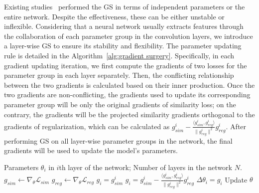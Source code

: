 \documentclass[runningheads]{llncs}
\begin{document}
Existing studies~\cite{yu2020gradient,mansilla2021domain} performed the GS in terms of independent parameters or the entire network. 
Despite the effectiveness, these can be either unstable or inflexible. Considering that a neural network usually extracts features through the collaboration of each parameter group in the convolution layers, we introduce a layer-wise GS to ensure its stability and flexibility. The parameter updating rule is detailed in the Algorithm~\ref{alg:gradient surgery}. Specifically, in each gradient updating iteration, we first compute the gradients of two losses for the parameter group in each layer separately. Then, the conflicting relationship between the two gradients is calculated based on their inner production. Once the two gradients are non-conflicting, the gradients used to update its corresponding parameter group will be only the original gradients of similarity loss; on the contrary, the gradients will be the projected similarity gradients orthogonal to the gradients of regularization, which can be calculated as $g_{sim}^{i} - \frac{\langle g_{sim}^{i}, g_{reg}^{i} \rangle}{\| g_{reg}^{i} \|^2} g_{reg}^{i}$. After performing GS on all layer-wise parameter groups in the network, the final gradients will be used to update the model's parameters.
\begin{minipage}{.75\linewidth}
\centering
\begin{algorithm}[H]
\caption{Gradient surgery}
\label{alg:gradient surgery}
\begin{algorithmic}[1]
\Require Parameters $\theta_i$ in $i$th layer of the network; Number of layers in the network $N$. 
\State $g_{sim} \gets \nabla_\theta \mathcal{L}_{sim}$
\State $g_{reg} \gets \nabla_\theta \mathcal{L}_{reg}$
    \State $g_i = g_{sim}^{i}$
\Else
    \State $g_i = g_{sim}^{i} - \frac{\langle g_{sim}^{i}, g_{reg}^{i} \rangle}{\| g_{reg}^{i} \|^2} g_{reg}^{i}$
\EndIf
\State $\Delta \theta_{i} = g_i$
\EndFor
\State Update $\theta$
\end{algorithmic}
\end{algorithm}
\end{minipage}
\end{document}

